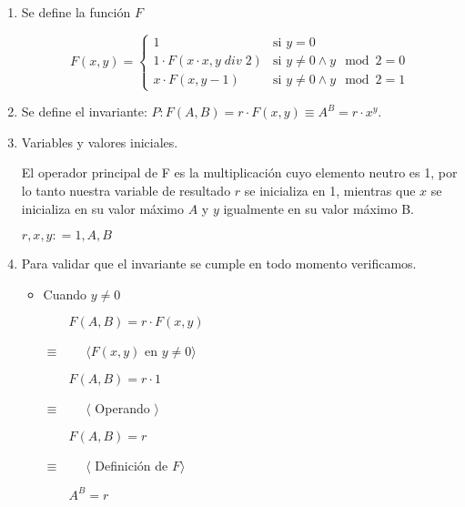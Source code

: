 \documentclass[hidelinks]{article}
\begin{document}
\begin{enumerate}
	\item Se define la función $F$\par

	      \begin{equation}
		      F(x,y) =
		      \begin{cases}
			      1                                   & \text{si } y = 0                       \\
			      1 \cdot F(x \cdot x, y \; div \; 2) & \text{si } y \neq 0 \land y \mod 2 = 0 \\
			      x \cdot F(x, y - 1)                 & \text{si } y \neq 0 \land y \mod 2 = 1
		      \end{cases}
	      \end{equation} \par

	\item Se define el invariante: $P: F(A,B) = r \cdot F(x,y) \equiv A^B = r \cdot x^y$.\par
	\item Variables y valores iniciales.\par

	      El operador principal de F es la multiplicación cuyo elemento neutro es 1, por
	      lo tanto nuestra variable de resultado $r$ se inicializa en 1, mientras que $x$
	      se inicializa en su valor máximo $A$ y $y$ igualmente en su valor máximo B.\par

	      \begin{center}
		      $r,x,y : = 1, A, B$
	      \end{center}

	\item Para validar que el invariante se cumple en todo momento verificamos.

	      \begin{itemize}
		      \item Cuando $y \neq 0$\par

		            $\qquad F(A,B) = r \cdot F(x,y)$\par
		            $\equiv \qquad \langle F(x,y)$ en $ y \neq 0 \rangle$\par
		            $\qquad F(A,B) = r \cdot 1$\par
		            $\equiv \qquad \langle$ Operando $\rangle$\par
		            $\qquad F(A,B) = r$\par
		            $\equiv \qquad \langle$ Definición de $F\rangle$\par
		            $\qquad A^B = r$\par


\end{itemize}
\end{enumerate}
\end{document}
